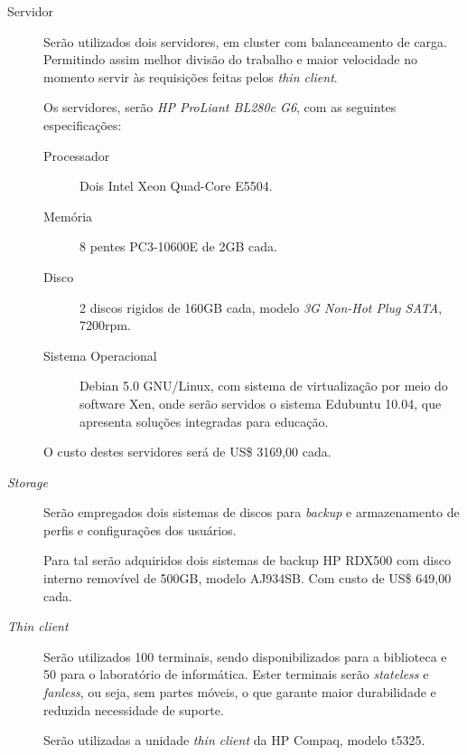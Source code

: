 \documentclass[a4paper,12pt]{report}
\begin{document}
            \begin{description}

                \item[Servidor] Serão utilizados dois servidores, em cluster
                com balanceamento de carga. Permitindo assim melhor divisão do
                trabalho e maior velocidade no momento servir às requisições
                feitas pelos \emph{thin client}.
                
                Os servidores, serão \emph{HP ProLiant BL280c G6}, com as
                seguintes especificações:

                \begin{description}

                    \item[Processador] Dois Intel Xeon Quad-Core E5504.

                    \item[Memória] 8 pentes PC3-10600E de 2GB cada.

                    \item[Disco] 2 discos rigidos de 160GB cada, modelo
                    \emph{3G Non-Hot Plug SATA}, 7200rpm.

                    \item[Sistema Operacional] Debian 5.0 GNU/Linux, com sistema
                    de virtualização por meio do software Xen, onde serão
                    servidos o sistema Edubuntu 10.04, que apresenta soluções
                    integradas para educação.

                \end{description}

                O custo destes servidores será de US\$ 3169,00 cada.

                \item[\emph{Storage}] Serão empregados dois sistemas de discos
                para \emph{backup} e armazenamento de perfis e configurações
                dos usuários.

                Para tal serão adquiridos dois sistemas de backup HP RDX500
                com disco interno removível de 500GB, modelo AJ934SB. Com custo
                de US\$ 649,00 cada.

                \item[\emph{Thin client}] Serão utilizados 100 terminais, sendo
                disponibilizados para a biblioteca e 50 para o laboratório de
                informática. Ester terminais serão \emph{stateless} e
                \emph{fanless}, ou seja, sem partes móveis, o que garante maior
                durabilidade e reduzida necessidade de suporte.

                Serão utilizadas a unidade \emph{thin client} da HP Compaq,
                modelo t5325.

            \end{description}
\end{document}
